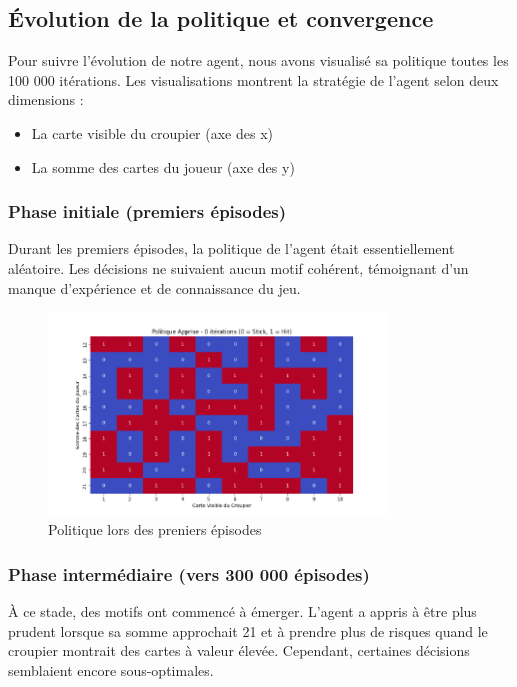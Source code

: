 \documentclass{article}
\begin{document}
\subsection{Évolution de la politique et convergence}

\quad Pour suivre l'évolution de notre agent, nous avons visualisé sa politique toutes les 100 000 itérations. Les visualisations montrent la stratégie de l'agent selon deux dimensions : 
\begin{itemize} 
    \item  La carte visible du croupier (axe des x)
    \item La somme des cartes du joueur (axe des y)
\end{itemize}

    \subsubsection{Phase initiale (premiers épisodes)}
    
    \quad Durant les premiers épisodes, la politique de l'agent était essentiellement aléatoire. Les décisions ne suivaient aucun motif cohérent, témoignant d'un manque d'expérience et de connaissance du jeu.\\
    
    \begin{figure}[ht]
        \centering
        \includegraphics[width=0.8\textwidth]{1.png}
        \caption{Politique lors des preniers épisodes}
    \end{figure}

    \subsubsection{Phase intermédiaire (vers 300 000 épisodes)}
    
    \quad À ce stade, des motifs ont commencé à émerger. L'agent a appris à être plus prudent lorsque sa somme approchait 21 et à prendre plus de risques quand le croupier montrait des cartes à valeur élevée. Cependant, certaines décisions semblaient encore sous-optimales.\\
\end{document}
